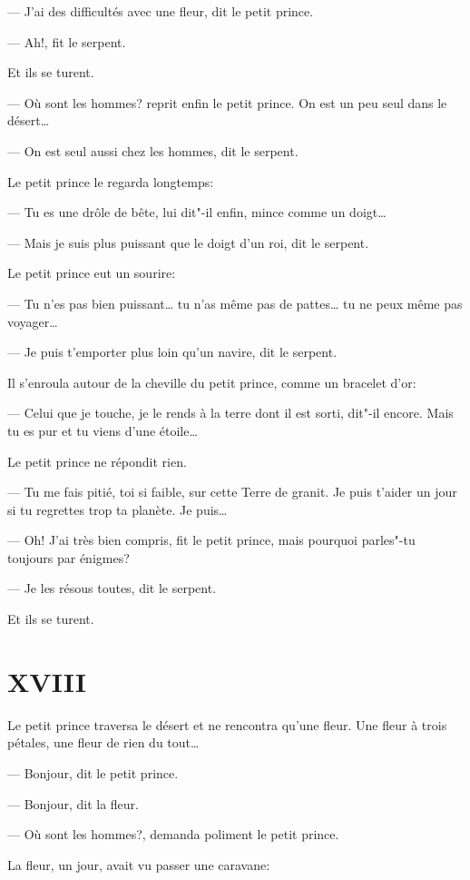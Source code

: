 \begin{Parallel}[p]{}{}
{--- J'ai des difficultés avec une fleur, dit le petit prince.

--- Ah!, fit le serpent.

Et ils se turent.

--- Où sont les hommes? reprit enfin le petit prince. On est un peu seul dans le désert\ldots{}

--- On est seul aussi chez les hommes, dit le serpent.

Le petit prince le regarda longtemps:

--- Tu es une drôle de bête, lui dit"-il enfin, mince
comme un doigt\ldots{}

--- Mais je suis plus puissant que le doigt d'un roi, dit le serpent.

Le petit prince eut un sourire:

--- Tu n'es pas bien puissant\ldots{} tu n'as même pas de
pattes\ldots{} tu ne peux même pas voyager\ldots{}

--- Je puis t'emporter plus loin qu'un navire, dit le serpent.

Il s'enroula autour de la cheville du petit prince, comme un bracelet d'or:

--- Celui que je touche, je le rends à la terre dont il
est sorti, dit"-il encore. Mais tu es pur et tu viens
d'une étoile\ldots{}

Le petit prince ne répondit rien.

--- Tu me fais pitié, toi si faible, sur cette Terre de
granit. Je puis t'aider un jour si tu regrettes trop ta
planète. Je puis\ldots{}

--- Oh! J'ai très bien compris, fit le petit prince,
mais pourquoi parles"-tu toujours par énigmes?

--- Je les résous toutes, dit le serpent.

Et ils se turent.

\section{XVIII}

Le petit prince traversa le désert et ne rencontra
qu'une fleur. Une fleur à trois pétales, une fleur de
rien du tout\ldots{}

--- Bonjour, dit le petit prince.

--- Bonjour, dit la fleur.

--- Où sont les hommes?, demanda poliment le petit prince.

La fleur, un jour, avait vu passer une caravane:

}
\end{Parallel}
